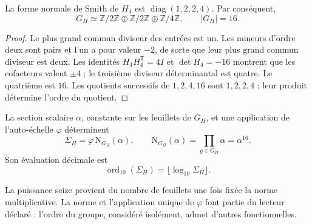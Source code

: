 \begin{lemma}
\label{x_reciprocidad:iv:action:smith}
La forme normale de Smith de \(H_4\) est
\(\operatorname{diag}(1,2,2,4)\). Par conséquent,
\[
 G_H\simeq\mathbb Z/2\mathbb Z\oplus\mathbb Z/2\mathbb Z
       \oplus\mathbb Z/4\mathbb Z,\qquad |G_H|=16.
\]
\end{lemma}
\begin{proof}
Le plus grand commun diviseur des entrées est un. Les mineurs
d’ordre deux sont pairs et l’un a pour valeur \(-2\), de sorte que leur plus grand
commun diviseur est deux. Les identités
\(H_4H_4^{\mathsf T}=4I\) et \(\det H_4=-16\) montrent que les
cofacteurs valent \(\pm4\) ; le troisième diviseur déterminantal est
quatre. Le quatrième est \(16\). Les quotients successifs de
\(1,2,4,16\) sont \(1,2,2,4\) ; leur produit détermine l’ordre
du quotient.
\end{proof}

\begin{definition}
\label{x_reciprocidad:iv:action:norma}
La section scalaire \(\alpha\), constante sur les feuillets de \(G_H\),
et une application de l’auto-échelle \(\varphi\) déterminent
\begin{equation}
 \Sigma_H=\varphi\,\mathrm N_{G_H}(\alpha),\qquad
 \mathrm N_{G_H}(\alpha)=\prod_{g\in G_H}\alpha=\alpha^{16}.
 \label{x_reciprocidad:iv:action:sigma}
\end{equation}
Son évaluation décimale est
\[
 \operatorname{ord}_{10}(\Sigma_H)
   =\lfloor\log_{10}\Sigma_H\rfloor.
\]
\end{definition}
La puissance seize provient du nombre de feuillets une fois fixée
la norme multiplicative. La norme et l’application unique de
\(\varphi\) font partie du lecteur déclaré : l’ordre du groupe,
considéré isolément, admet d’autres fonctionnelles.

